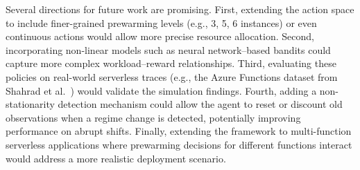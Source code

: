\documentclass[11pt]{article}
\begin{document}
Several directions for future work are promising. First, extending the action space to include finer-grained prewarming levels (e.g., 3, 5, 6 instances) or even continuous actions would allow more precise resource allocation. Second, incorporating non-linear models such as neural network--based bandits could capture more complex workload--reward relationships. Third, evaluating these policies on real-world serverless traces (e.g., the Azure Functions dataset from Shahrad et al.~\cite{shahrad2020}) would validate the simulation findings. Fourth, adding a non-stationarity detection mechanism could allow the agent to reset or discount old observations when a regime change is detected, potentially improving performance on abrupt shifts. Finally, extending the framework to multi-function serverless applications where prewarming decisions for different functions interact would address a more realistic deployment scenario.


\end{document}
